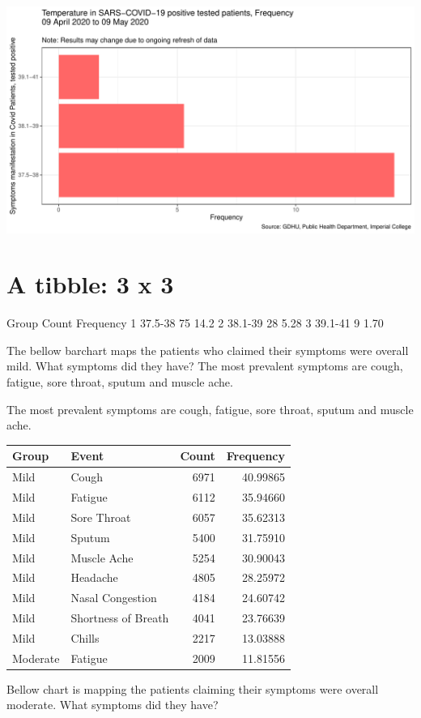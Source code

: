 \documentclass[
]{article}
\begin{document}
\includegraphics{Final_descript_analysis_files/figure-latex/temperature-1.pdf}

\hypertarget{a-tibble-3-x-3}{%
\section{A tibble: 3 x 3}\label{a-tibble-3-x-3}}

Group Count Frequency 1 37.5-38 75 14.2 2 38.1-39 28 5.28 3 39.1-41 9
1.70

The bellow barchart maps the patients who claimed their symptoms were
overall mild. What symptoms did they have? The most prevalent symptoms
are cough, fatigue, sore throat, sputum and muscle ache.

\hypertarget{htmlwidget-1c4ff5e95f50863b0e26}{}
\begin{plotly}

\end{plotly}

The most prevalent symptoms are cough, fatigue, sore throat, sputum and
muscle ache.

\begin{longtable}[]{@{}llrr@{}}
\toprule
Group & Event & Count & Frequency\tabularnewline
\midrule
\endhead
Mild & Cough & 6971 & 40.99865\tabularnewline
Mild & Fatigue & 6112 & 35.94660\tabularnewline
Mild & Sore Throat & 6057 & 35.62313\tabularnewline
Mild & Sputum & 5400 & 31.75910\tabularnewline
Mild & Muscle Ache & 5254 & 30.90043\tabularnewline
Mild & Headache & 4805 & 28.25972\tabularnewline
Mild & Nasal Congestion & 4184 & 24.60742\tabularnewline
Mild & Shortness of Breath & 4041 & 23.76639\tabularnewline
Mild & Chills & 2217 & 13.03888\tabularnewline
Moderate & Fatigue & 2009 & 11.81556\tabularnewline
\bottomrule
\end{longtable}

Bellow chart is mapping the patients claiming their symptoms were
overall moderate. What symptoms did they have?
\end{document}

